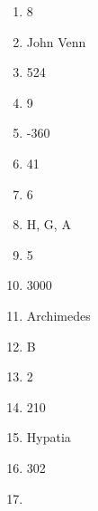 \documentclass[../uilmath.tex]{subfiles}
\begin{document}
\begin{enumerate}[label=\bfseries\arabic*.]
    \item %
    8

    \item %
    John Venn 

    \item %
    524

    \item %
    9

    \item %
    -360

    \item %
    41

    \item %
    6

    \item %
    H, G, A 

    \item %
    5

    \item %
    3000

    \item %
    Archimedes

    \item %
    B 

    \item %
    2

    \item %
    210

    \item %
    Hypatia 

    \item %
    302

    \item %
    
\end{enumerate}
\end{document}
